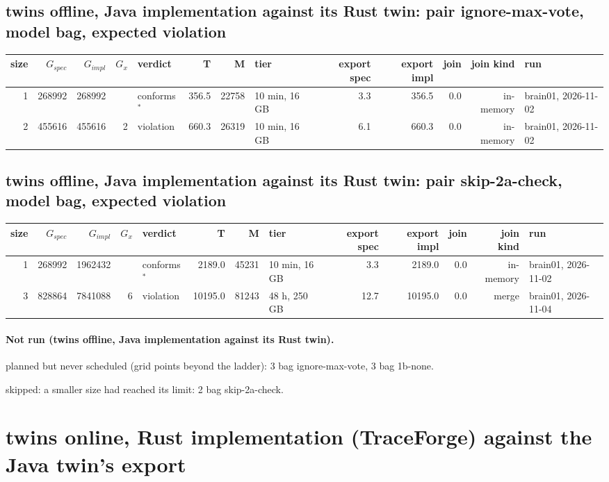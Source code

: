 \documentclass[10pt]{article}
\begin{document}
\subsection*{twins offline, Java implementation against its Rust twin: pair \textsf{ignore-max-vote}, model bag, expected violation}
\begin{longtable}{@{}rrrrlrrlrrrrl@{}}
\toprule
size & $G_{\mathit{spec}}$ & $G_{\mathit{impl}}$ & $G_x$ & verdict & T & M & tier & export spec & export impl & join & join kind & run \\
\midrule
\endhead
\color{red} 1 & 268992 & 268992 &  & conforms$^{\ast}$ & 356.5 & 22758 & 10 min, 16 GB & 3.3 & 356.5 & 0.0 & in-memory & brain01, 2026-11-02 \\
\color{red} 2 & 455616 & 455616 & 2 & violation & 660.3 & 26319 & 10 min, 16 GB & 6.1 & 660.3 & 0.0 & in-memory & brain01, 2026-11-02 \\
\bottomrule
\end{longtable}
\subsection*{twins offline, Java implementation against its Rust twin: pair \textsf{skip-2a-check}, model bag, expected violation}
\begin{longtable}{@{}rrrrlrrlrrrrl@{}}
\toprule
size & $G_{\mathit{spec}}$ & $G_{\mathit{impl}}$ & $G_x$ & verdict & T & M & tier & export spec & export impl & join & join kind & run \\
\midrule
\endhead
\color{red} 1 & 268992 & 1962432 &  & conforms$^{\ast}$ & 2189.0 & 45231 & 10 min, 16 GB & 3.3 & 2189.0 & 0.0 & in-memory & brain01, 2026-11-02 \\
\color{blue} 3 & 828864 & 7841088 & 6 & violation & 10195.0 & 81243 & 48 h, 250 GB & 12.7 & 10195.0 & 0.0 & merge & brain01, 2026-11-04 \\
\bottomrule
\end{longtable}
\paragraph{Not run (twins offline, Java implementation against its Rust twin).}
planned but never scheduled (grid points beyond the ladder): 3 bag ignore-max-vote, 3 bag 1b-none.\par
skipped: a smaller size had reached its limit: 2 bag skip-2a-check.\par
\section*{twins online, Rust implementation (TraceForge) against the Java twin's export}
\end{document}
